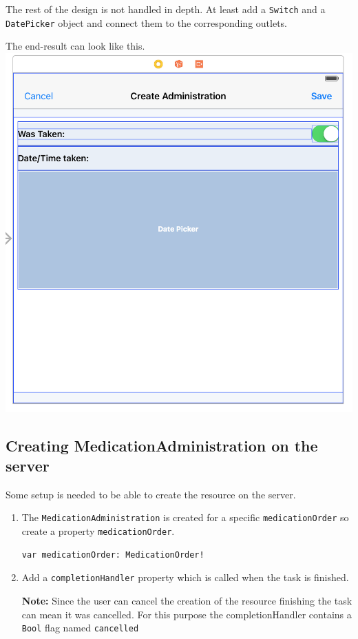 \documentclass{article}
\begin{document}
The rest of the design is not handled in depth. At least add a
\texttt{Switch} and a \texttt{DatePicker} object and connect them to the
corresponding outlets.

The end-result can look like this.
\includegraphics{resources/step8/create_administration.png}
\subsection{Creating MedicationAdministration on the server}\label{step-8.2---implementing-createmedicationadministrationviewcontroller---creating-the-medicationadministration-on-the-server.}

Some setup is needed to be able to create the resource on the server.

\begin{enumerate}
\item
  The \texttt{MedicationAdministration} is created for a specific
  \texttt{medicationOrder} so create a property
  \texttt{medicationOrder}.

\begin{verbatim}
var medicationOrder: MedicationOrder!
\end{verbatim}
\item
  Add a \texttt{completionHandler} property which is called when the
  task is finished.

  \textbf{Note:} Since the user can
  cancel the creation of the resource finishing the task can mean it was
  cancelled.
  For this purpose the completionHandler
  contains a \texttt{Bool} flag named \texttt{cancelled}
\end{enumerate}
\end{document}

